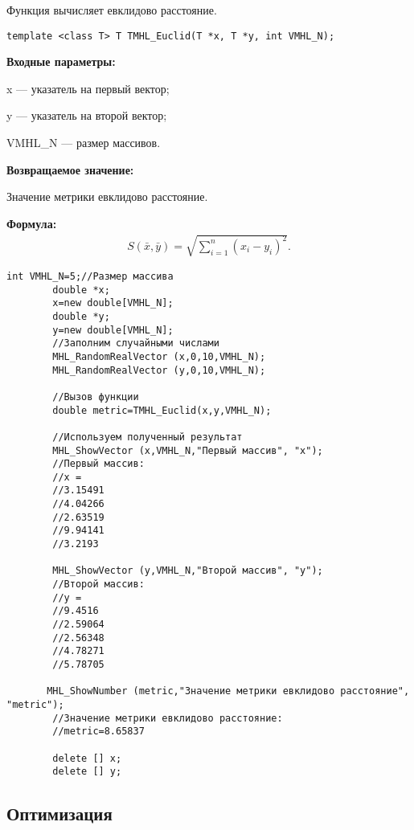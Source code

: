 \documentclass[a4paper,12pt]{article}
\begin{document}
Функция вычисляет евклидово расстояние.


\begin{lstlisting}[label=code_syntax_TMHL_Euclid,caption=Синтаксис]
template <class T> T TMHL_Euclid(T *x, T *y, int VMHL_N);
\end{lstlisting}

\textbf{Входные параметры:}
 
x --- указатель на первый вектор;
 
y --- указатель на второй вектор;
 
VMHL\_N --- размер массивов.

\textbf{Возвращаемое значение:}
 
 Значение метрики евклидово расстояние.

\textbf{Формула:}
\begin{eqnarray*}
S\left( \bar{x}, \bar{y}\right)=\sqrt{\sum_{i=1}^n {\left( x_i-y_i \right)}^2}   .
\end{eqnarray*}


\begin{lstlisting}[label=code_use_TMHL_Euclid,caption=Пример использования]
        int VMHL_N=5;//Размер массива
        double *x;
        x=new double[VMHL_N];
        double *y;
        y=new double[VMHL_N];
        //Заполним случайными числами
        MHL_RandomRealVector (x,0,10,VMHL_N);
        MHL_RandomRealVector (y,0,10,VMHL_N);

        //Вызов функции
        double metric=TMHL_Euclid(x,y,VMHL_N);

        //Используем полученный результат
        MHL_ShowVector (x,VMHL_N,"Первый массив", "x");
        //Первый массив:
        //x =	
        //3.15491
        //4.04266
        //2.63519
        //9.94141
        //3.2193

        MHL_ShowVector (y,VMHL_N,"Второй массив", "y");
        //Второй массив:
        //y =	
        //9.4516
        //2.59064
        //2.56348
        //4.78271
        //5.78705

       MHL_ShowNumber (metric,"Значение метрики евклидово расстояние", "metric");
        //Значение метрики евклидово расстояние:
        //metric=8.65837

        delete [] x;
        delete [] y;
\end{lstlisting}

\subsection{Оптимизация}
\end{document}
